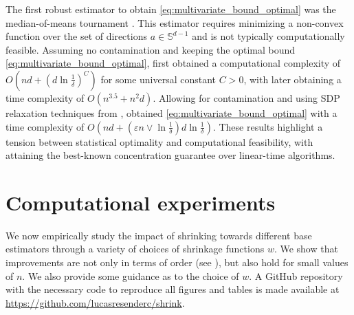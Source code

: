 \documentclass{article}
\theoremstyle{plain}
\theoremstyle{definition}
\def\eps{\varepsilon}
\begin{document}
The first robust estimator to obtain \eqref{eq:multivariate_bound_optimal} was the median-of-means tournament \cite{lugosi2019vector}. This estimator requires minimizing a non-convex function over the set of directions $a \in \mathbb{S}^{d-1}$ and is not typically computationally feasible. Assuming no contamination and keeping the optimal bound \eqref{eq:multivariate_bound_optimal}, \cite{hopkins2020} first obtained a computational complexity of $O\left( nd + \left(d \ln\frac{1}{\delta}\right)^C \right)$ for some universal constant $C>0$, with \cite{cherapanamjeri2019fast} later obtaining a time complexity of $O(n^{3.5}+n^2d)$. Allowing for contamination and using SDP relaxation techniques from \cite{cheng2019high}, \cite{depersin2022robust} obtained \eqref{eq:multivariate_bound_optimal} with a time complexity of $O\left(nd + \left(\eps n \vee \ln\frac{1}{\delta}\right) d \ln\frac{1}{\delta} \right)$. These results highlight a tension between statistical optimality and computational feasibility, with  attaining the best-known concentration guarantee over linear-time algorithms.







\section{Computational experiments}\label{sec:experiments}

We now empirically study the impact of shrinking towards different base estimators through a variety of choices of shrinkage functions \( w \). We show that improvements are not only in terms of order (see ), but also hold for small values of $n$. We also provide some guidance as to the choice of $w$. A GitHub repository with the necessary code to reproduce all figures and tables is made available at \url{https://github.com/lucasresenderc/shrink}.
\end{document}

